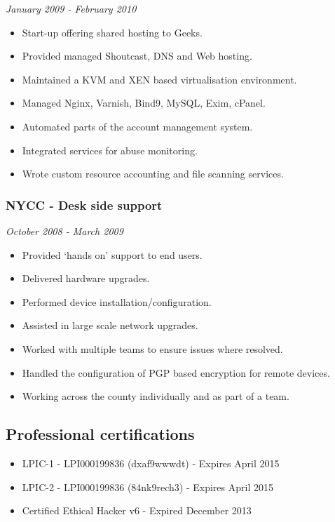 \emph{January 2009 - February 2010}

\begin{itemize}
\itemsep1pt\parskip0pt
\item
  Start-up offering shared hosting to Geeks.
\item
  Provided managed Shoutcast, DNS and Web hosting.
\item
  Maintained a KVM and XEN based virtualisation environment.
\item
  Managed Nginx, Varnish, Bind9, MySQL, Exim, cPanel.
\item
  Automated parts of the account management system.
\item
  Integrated services for abuse monitoring.
\item
  Wrote custom resource accounting and file scanning services.
\end{itemize}

\subsubsection{NYCC - Desk side support}\label{nycc---desk-side-support}

\emph{October 2008 - March 2009}

\begin{itemize}
\itemsep1pt\parskip0pt
\item
  Provided `hands on' support to end users.
\item
  Delivered hardware upgrades.
\item
  Performed device installation/configuration.
\item
  Assisted in large scale network upgrades.
\item
  Worked with multiple teams to ensure issues where resolved.
\item
  Handled the configuration of PGP based encryption for remote devices.
\item
  Working across the county individually and as part of a team.
\end{itemize}

\subsection{Professional
certifications}\label{professional-certifications}

\begin{itemize}
\itemsep1pt\parskip0pt
\item
  LPIC-1 - LPI000199836 (dxaf9wwwdt) - Expires April 2015
\item
  LPIC-2 - LPI000199836 (84nk9rech3) - Expires April 2015
\item
  Certified Ethical Hacker v6 - Expired December 2013
\end{itemize}


